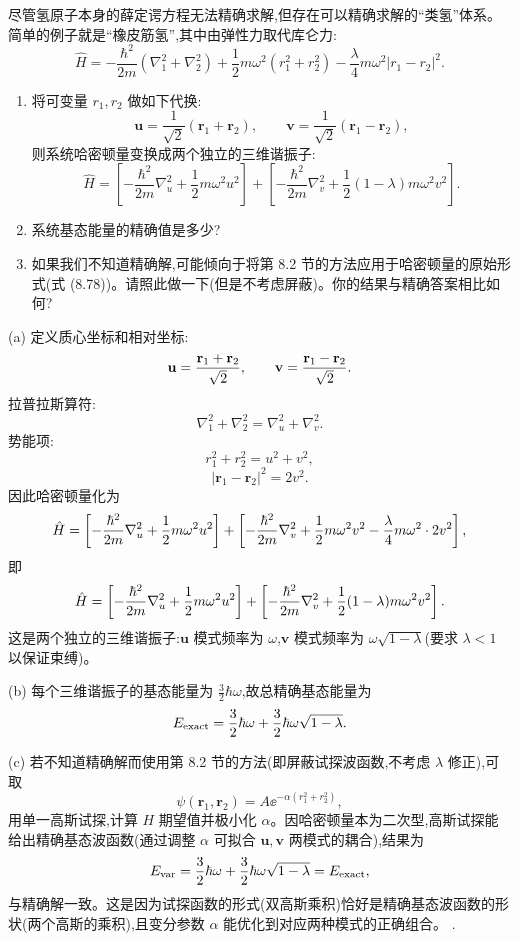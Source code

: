 \begin{question}
尽管氢原子本身的薛定谔方程无法精确求解,但存在可以精确求解的“类氢”体系。简单的例子就是“橡皮筋氢”,其中由弹性力取代库仑力:
\[
\hat H=-\frac{\hbar^2}{2m}(\nabla_1^2+\nabla_2^2)+\frac12m\omega^2(r_1^2+r_2^2)-\frac{\lambda}{4}m\omega^2|r_1-r_2|^2.
\]
\begin{enumerate}
\item 将可变量 $r_1,r_2$ 做如下代换:
\[
\mathbf u=\frac{1}{\sqrt2}(\mathbf r_1+\mathbf r_2),\qquad
\mathbf v=\frac{1}{\sqrt2}(\mathbf r_1-\mathbf r_2),
\]
则系统哈密顿量变换成两个独立的三维谐振子:
\[
\hat H=\left[-\frac{\hbar^2}{2m}\nabla_u^2+\frac12m\omega^2u^2\right]+
\left[-\frac{\hbar^2}{2m}\nabla_v^2+\frac12(1-\lambda)m\omega^2v^2\right].
\]
\item 系统基态能量的精确值是多少?
\item 如果我们不知道精确解,可能倾向于将第 8.2 节的方法应用于哈密顿量的原始形式(式 (8.78))。请照此做一下(但是不考虑屏蔽)。你的结果与精确答案相比如何?
\end{enumerate}

\par\smallskip
{}

\end{question}
\begin{solution}
(a) 定义质心坐标和相对坐标:
\[
\mathbf u={\mathbf r_1+\mathbf r_2\over\sqrt2},\qquad
\mathbf v={\mathbf r_1-\mathbf r_2\over\sqrt2}.
\]
拉普拉斯算符:
\[
\nabla_1^2+\nabla_2^2=\nabla_u^2+\nabla_v^2.
\]
势能项:
\[
r_1^2+r_2^2=u^2+v^2,
\]
\[
|\mathbf r_1-\mathbf r_2|^2=2v^2.
\]
因此哈密顿量化为
\[
\hat H=\left[-{\hbar^2\over2m}\nabla_u^2+{1\over2}m\omega^2u^2\right]
+\left[-{\hbar^2\over2m}\nabla_v^2+{1\over2}m\omega^2v^2-{\lambda\over4}m\omega^2\cdot2v^2\right],
\]
即
\[
\hat H=\left[-{\hbar^2\over2m}\nabla_u^2+{1\over2}m\omega^2u^2\right]
+\left[-{\hbar^2\over2m}\nabla_v^2+{1\over2}(1-\lambda)m\omega^2v^2\right].
\]
这是两个独立的三维谐振子:$\mathbf u$ 模式频率为 $\omega$,$\mathbf v$ 模式频率为 $\omega\sqrt{1-\lambda}$(要求 $\lambda<1$ 以保证束缚)。

(b) 每个三维谐振子的基态能量为 $\frac32\hbar\omega$,故总精确基态能量为
\[
E_{\rm exact}=\frac32\hbar\omega+\frac32\hbar\omega\sqrt{1-\lambda}.
\]

(c) 若不知道精确解而使用第 8.2 节的方法(即屏蔽试探波函数,不考虑 $\lambda$ 修正),可取
\[
\psi(\mathbf r_1,\mathbf r_2)=A \ee^{-\alpha(r_1^2+r_2^2)},
\]
用单一高斯试探,计算 $H$ 期望值并极小化 $\alpha$。因哈密顿量本为二次型,高斯试探能给出精确基态波函数(通过调整 $\alpha$ 可拟合 $\mathbf u,\mathbf v$ 两模式的耦合),结果为
\[
E_{\rm var}=\frac32\hbar\omega+\frac32\hbar\omega\sqrt{1-\lambda}=E_{\rm exact},
\]
与精确解一致。这是因为试探函数的形式(双高斯乘积)恰好是精确基态波函数的形状(两个高斯的乘积),且变分参数 $\alpha$ 能优化到对应两种模式的正确组合。
.
\end{solution}


